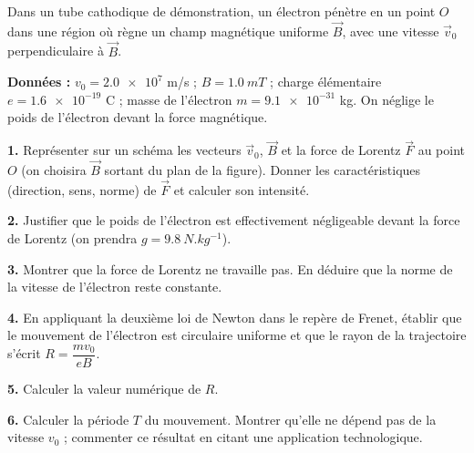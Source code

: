 \documentclass[11pt]{article}
\newcounter{popsec}
\newcounter{popsub}
\newcommand{\courssub}[1]{%
  \stepcounter{popsub}%
  \par\vspace{9pt}\noindent{\popxbold\fontsize{11.5}{13}\selectfont\color{popink}{\color{poporange}\thepopsec.\thepopsub}\hspace{6pt}#1}\par\nopagebreak\vspace{4pt}
}
\begin{document}
\courssub{Je me prépare au Bac}

\begin{exercice}
Dans un tube cathodique de démonstration, un électron pénètre en un point $O$ dans une région où règne un champ magnétique uniforme $\vec{B}$, avec une vitesse $\vec{v}_0$ perpendiculaire à $\vec{B}$.

\textbf{Données :} $v_0 = \num{2,0e7}$ m/s ; $B = \SI{1,0}{mT}$ ; charge élémentaire $e = \num{1,6e-19}$ C ; masse de l'électron $m = \num{9,1e-31}$ kg. On néglige le poids de l'électron devant la force magnétique.

\textbf{1.} Représenter sur un schéma les vecteurs $\vec{v}_0$, $\vec{B}$ et la force de Lorentz $\vec{F}$ au point $O$ (on choisira $\vec{B}$ sortant du plan de la figure). Donner les caractéristiques (direction, sens, norme) de $\vec{F}$ et calculer son intensité.

\textbf{2.} Justifier que le poids de l'électron est effectivement négligeable devant la force de Lorentz (on prendra $g = \SI{9,8}{N.kg^{-1}}$).

\textbf{3.} Montrer que la force de Lorentz ne travaille pas. En déduire que la norme de la vitesse de l'électron reste constante.

\textbf{4.} En appliquant la deuxième loi de Newton dans le repère de Frenet, établir que le mouvement de l'électron est circulaire uniforme et que le rayon de la trajectoire s'écrit $R = \dfrac{m v_0}{e B}$.

\textbf{5.} Calculer la valeur numérique de $R$.

\textbf{6.} Calculer la période $T$ du mouvement. Montrer qu'elle ne dépend pas de la vitesse $v_0$ ; commenter ce résultat en citant une application technologique.
\end{exercice}
\end{document}
